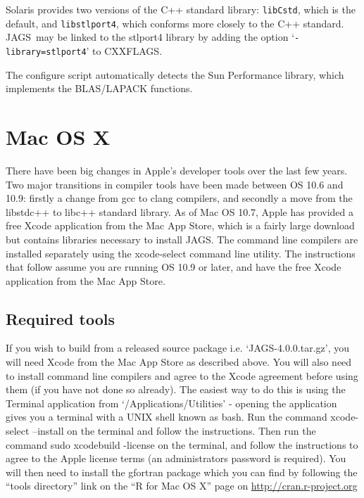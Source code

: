 \documentclass[11pt, a4paper, titlepage]{article}
\newcommand{\release}{4.0.0}
\newcommand{\JAGS}{\textsf{JAGS}}
\newcommand{\code}[1]{{\bgroup{\normalfont\ttfamily #1}\egroup}}
\newcommand{\samp}[1]{{`\bgroup\normalfont\texttt{#1}'\egroup}}
\newcommand{\file}[1]{{`\normalfont\textsf{#1}'}}
\let\option=\samp
\begin{document}
Solaris provides two versions of the C++ standard library:
\texttt{libCstd}, which is the default, and \texttt{libstlport4},
which conforms more closely to the C++ standard. \JAGS\ may be linked
to the stlport4 library by adding the option
\option{-library=stlport4} to \code{CXXFLAGS}. 

The configure script automatically detects the Sun Performance library,
which implements the BLAS/LAPACK functions.  

\clearpage
\section{Mac OS X}

There have been big changes in Apple's developer tools over the last few
years.  Two major transitions in compiler tools have been made between
OS 10.6 and 10.9: firstly a change from gcc to clang compilers, and
secondly a move from the libstdc++ to libc++ standard library.  As of
Mac OS 10.7, Apple has provided a free Xcode application from the Mac
App Store, which is a fairly large download but contains libraries
necessary to install \JAGS. The command line compilers are installed
separately using the \code{xcode-select} command line utility.  The 
instructions that follow assume you are running OS 10.9 or later, and 
have the free Xcode application from the Mac App Store.

\subsection{Required tools}

If you wish to build from a released source package i.e.
\file{JAGS-\release.tar.gz}, you will need Xcode from the Mac App Store
as described above.  You will also need to install command line compilers
and agree to the Xcode agreement before using them (if you have not
done so already). The easiest way to do this is using the Terminal
application from \file{/Applications/Utilities} - opening the
application gives you a terminal with a UNIX shell known as bash.  Run
the command \code{xcode-select --install} on the terminal and follow the
instructions.  Then run the command \code{sudo xcodebuild -license} 
on the terminal, and follow the instructions to agree to the Apple
license terms (an administrators password is required).  You will then
need to install the gfortran package which you can find by following the
``tools directory'' link on the ``R for Mac OS X'' page on
\url{http://cran.r-project.org}
\end{document}
